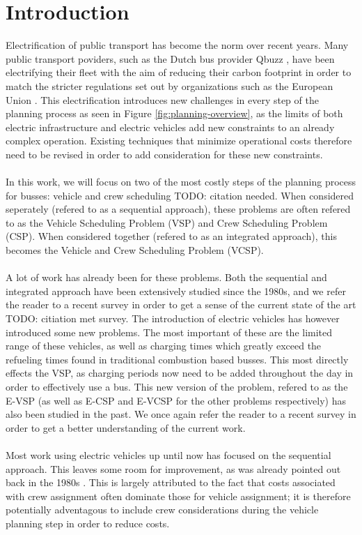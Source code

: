 \documentclass[]{article}
\begin{document}
\section{Introduction}
Electrification  of public transport has become the norm over recent years. Many public transport poviders, such as the Dutch bus provider Qbuzz \cite{qbuzzQbuzz}, have been electrifying their fleet with the aim of reducing their carbon footprint in order to match the stricter regulations set out by organizations such as the European Union \cite{europaRegulation20181999}. This electrification introduces new challenges in every step of the planning process as seen in Figure \ref{fig:planning-overview}, as the limits of both electric infrastructure and electric vehicles add new constraints to an already complex operation. Existing techniques that minimize operational costs therefore need to be revised in order to add consideration for these new constraints. \\\\
In this work, we will focus on two of the most costly steps of the planning process for busses: vehicle and crew scheduling TODO: citation needed. When considered seperately (refered to as a sequential approach), these problems are often refered to as the Vehicle Scheduling Problem (VSP) and Crew Scheduling Problem (CSP). When considered together (refered to as an integrated approach), this becomes the Vehicle and Crew Scheduling Problem (VCSP). \\\\
A lot of work has already been for these problems. Both the sequential and integrated approach have been extensively studied since the 1980s, and we refer the reader to a recent survey in order to get a sense of the current state of the art TODO: citiation met survey. The introduction of electric vehicles has however introduced some new problems. The most important of these are the limited range of these vehicles, as well as charging times which greatly exceed the refueling times found in traditional combustion based busses. This most directly effects the VSP, as charging periods now need to be added throughout the day in order to effectively use a bus. This new version of the problem, refered to as the E-VSP (as well as E-CSP and E-VCSP for the other problems respectively) has also been studied in the past. We once again refer the reader to a recent survey in order to get a better understanding of the current work. \\\\
Most work using electric vehicles up until now has focused on the sequential approach. This leaves some room for improvement, as was already pointed out back in the 1980s \cite{RAFF198363}. This is largely attributed to the fact that costs associated with crew assignment often dominate those for vehicle assignment; it is therefore potentially adventagous to include crew considerations during the vehicle planning step in order to reduce costs. \\\\
\end{document}
